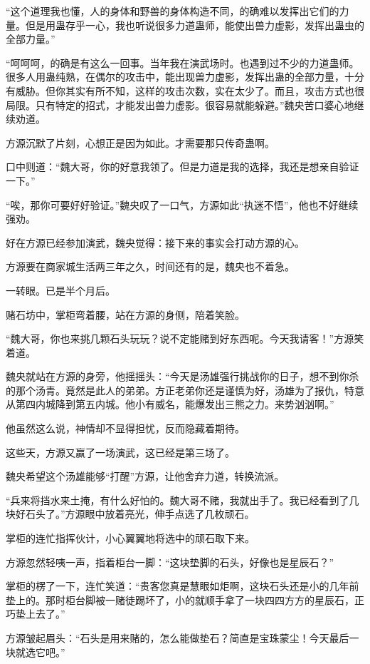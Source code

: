 \begin{this_body}
“这个道理我也懂，人的身体和野兽的身体构造不同，的确难以发挥出它们的力量。但是用蛊存乎一心，我也听说很多力道蛊师，能使出兽力虚影，发挥出蛊虫的全部力量。”

“呵呵呵，的确是有这么一回事。当年我在演武场时。也遇到过不少的力道蛊师。很多人用蛊纯熟，在偶尔的攻击中，能出现兽力虚影，发挥出蛊的全部力量，十分有威胁。但你其实有所不知，这样的攻击次数，实在太少了。而且，攻击方式也很局限。只有特定的招式，才能发出兽力虚影。很容易就能躲避。”魏央苦口婆心地继续劝道。

方源沉默了片刻，心想正是因为如此。才需要那只传奇蛊啊。

口中则道：“魏大哥，你的好意我领了。但是力道是我的选择，我还是想亲自验证一下。”

“唉，那你可要好好验证。”魏央叹了一口气，方源如此“执迷不悟”，他也不好继续强劝。

好在方源已经参加演武，魏央觉得：接下来的事实会打动方源的心。

方源要在商家城生活两三年之久，时间还有的是，魏央也不着急。

一转眼。已是半个月后。

赌石坊中，掌柜弯着腰，站在方源的身侧，陪着笑脸。

“魏大哥，你也来挑几颗石头玩玩？说不定能赌到好东西呢。今天我请客！”方源笑着道。

魏央就站在方源的身旁，他摇摇头：“今天是汤雄强行挑战你的日子，想不到你杀的那个汤青。竟然是此人的弟弟。方正老弟你还是谨慎为好，汤雄为了报仇，特意从第四内城降到第五内城。他小有威名，能爆发出三熊之力。来势汹汹啊。”

他虽然这么说，神情却不显得担忧，反而隐藏着期待。

这些天，方源又赢了一场演武，这已经是第三场了。

魏央希望这个汤雄能够“打醒”方源，让他舍弃力道，转换流派。

“兵来将挡水来土掩，有什么好怕的。魏大哥不赌，我就出手了。我已经看到了几块好石头了。”方源眼中放着亮光，伸手点选了几枚顽石。

掌柜的连忙指挥伙计，小心翼翼地将选中的顽石取下来。

方源忽然轻咦一声，指着柜台一脚：“这块垫脚的石头，好像也是星辰石？”

掌柜的楞了一下，连忙笑道：“贵客您真是慧眼如炬啊，这块石头还是小的几年前垫上的。那时柜台脚被一赌徒踢坏了，小的就顺手拿了一块四四方方的星辰石，正巧垫上去了。”

方源皱起眉头：“石头是用来赌的，怎么能做垫石？简直是宝珠蒙尘！今天最后一块就选它吧。”


\end{this_body}
